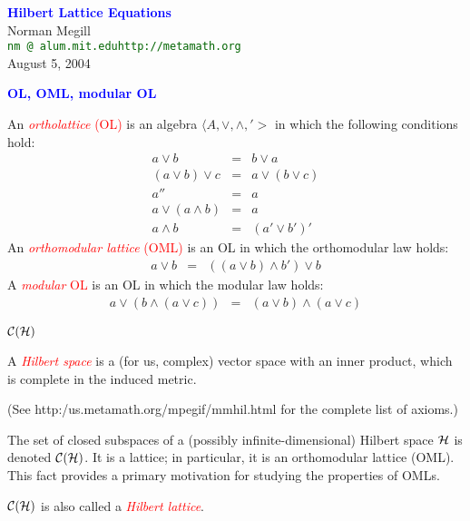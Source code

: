 \documentclass{slides}
\begin{document}
\raggedright
\pagecolor{mint}


\begin{slide}
\begin{center}
\textcolor{blue}{\textbf{\LARGE Hilbert Lattice
Equations}}\\
\vspace{3ex}
{\large Norman Megill}\\
\vspace{1ex}
\textcolor{darkgreen}{\texttt{nm {}@ alum.mit.edu\qquad http://metamath.org}}\\
\vspace{1ex}
August 5, 2004
\end{center}
\end{slide}

\begin{slide}

\begin{center}
\textcolor{blue}{\textbf{OL, OML, modular OL}}
\end{center}

An \textcolor{red}{\textit{ortholattice} (OL)} is an algebra
$\langle A,\vee,\wedge,'>$ in which the following conditions hold:
\begin{eqnarray}
a\vee b & = & b\vee a\\
(a\vee b)\vee c & = & a\vee (b\vee c)\\
a'' & = & a\\
a\vee (a\wedge b) & = & a\\
a\wedge b & = & (a'\vee b')'
\end{eqnarray}
An \textcolor{red}{\textit{orthomodular lattice} (OML)} is an OL in which
the orthomodular law holds:
\begin{eqnarray}
a\vee b & = & ((a\vee b)\wedge b')\vee b
\end{eqnarray}
A \textcolor{red}{\textit{modular} OL} is an OL in which the modular law holds:
\begin{eqnarray}
 a\vee (b\wedge (a\vee c))  & = &  (a\vee b)\wedge (a\vee c)
\end{eqnarray}


\end{slide}
\begin{slide}

\begin{center}
\textcolor{blue}{\textbf{${\cal C}({\cal H})$}}
\end{center}

A \textcolor{red}{\textit{Hilbert space}} is a (for us, complex) vector space
with an inner product, which is complete in the induced metric.

(See http:/us.metamath.org/mpegif/mmhil.html for the complete list of
axioms.)

The set of closed subspaces of a (possibly infinite-dimensional) Hilbert
space ${\cal H}$ is denoted \textcolor{red}{${\cal C}({\cal H})$}.  It
is a lattice; in particular, it is an orthomodular lattice (OML).  This
fact provides a primary motivation for studying the properties of OMLs.

${\cal C}({\cal H})$ is also called a \textcolor{red}{\textit{Hilbert lattice}}.

\end{slide}
\end{document}
